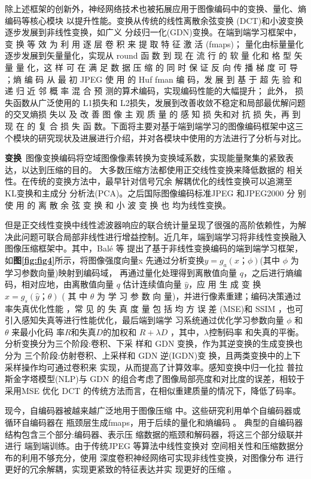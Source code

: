 除上述框架的创新外，神经网络技术也被拓展应用于图像编码中的变换、量化、熵编码等核心模块 以提升性能。变换从传统的线性离散余弦变换 (DCT)和小波变换逐步发展到非线性变换，如广义 分歧归一化(GDN)变换。在端到端学习框架中，变 换 等 效 为 利 用 逐 层 卷 积 来 提 取 特 征 激 活 (fmaps)； 量化由标量量化逐步发展到矢量量化，实现从 round 函 数 到 现 在 流 行 的 软 量 化和 格 型 矢 量 量 化，这 样 可 在 满 足 数 据 压 缩 的 同 时 保 证 反 向 传 播 梯 度 可 导 ；熵 编 码 从 最 初 JPEG 使 用 的 Huf fman 编 码，发 展 到 基 于 超 先 验 和 递 归 近 邻 概 率 混 合 预 测的算术编码，实现编码性能的大幅提升； 此外， 损失函数从广泛使用的 L1损失和 L2损失，发展到改善收敛不稳定和局部最优解问题的交叉熵损 失以 及 改 善 图 像 主 观 质 量 的 感 知 损 失和对 抗 损 失，再 到 现 在 的 复 合 损 失 函 数。下面将主要对基于端到端学习的图像编码框架中这三个模块的研究现状及进展进行介绍，并对各模块中使用的方法进行了分析与对比。

\noindent\textbf{变换}~图像变换编码将空域图像像素转换为变换域系数，实现能量聚集的紧致表达，以达到压缩的目的。 大多数压缩方法都使用正交线性变换来降低数据的 相关性。在传统的变换方法中，最早针对信号冗余 解耦优化的线性变换可以追溯至 KL变换和主成分 分析法(PCA)。之后国际图像编码标准JPEG 和JPEG2000 分 别 使 用 的 离 散 余 弦 变 换 和 小 波 变 换 也 均为线性变换。

但是正交线性变换中线性滤波器响应的联合统计量呈现了很强的高阶依赖性，为解决此问题可联合局部非线性进行增益控制。近几年，端到端学习将非线性变换融入图像压缩框架中。其中，Balé 等 \cite{balle2016end, DBLP:conf/pcs/BalleLS16}提出了基于非线性变换编码的端到端学习框架，如\textbf{图\ref{fig:fig4}}所示，将图像强度向量x 先通过分析变换$y= g_a(x；\phi)$(其中 $\phi$ 为学习参数向量)映射到编码域， 再通过量化处理得到离散值向量 $q$，之后进行熵编码，相对应地，由离散值向量 $q$ 估计连续值向量 $\hat{y}$，应 用 生 成 变 换 $\hat{x}=g_s(\hat{y}；\theta)$ ( 其 中 $\theta$ 为 学 习 参 数 向 量)，并进行像素重建；编码决策通过率失真优化性能 ，常 见 的 失 真 度 量 包 括 均 方 误 差 (MSE)和 SSIM ，也可引入感知失真等进行性能优化，最后端到端学 习系统通过优化学习参数向量 $\phi$ 和 $\theta$ 来最小化码 率$R$和失真$D$的加权和 $R+\lambda D$ ，其中，$\lambda$控制码率 和失真的平衡。分析变换分为三个阶段:卷积、下采 样和 GDN 变换，作为其逆变换的生成变换也分为 三个阶段:仿射卷积、上采样和 GDN 逆(IGDN)变 换，且两类变换中的上下采样操作均可通过卷积来 实现，从而提高了计算效率。感知变换中归一化拉 普拉斯金字塔模型(NLP)与 GDN 的组合考虑了图像局部亮度和对比度的误差，相较于采用MSE 优化 DCT 的传统方法而言，在相似重建质量的情况下，降低了码率。

现今，自编码器被越来越广泛地用于图像压缩 中。这些研究利用单个自编码器或循环自编码器在 瓶颈层生成fmaps，用于后续的量化和熵编码 \cite{liu2018deep}。 典型的自编码器结构包含三个部分:编码器、表示压 缩数据的瓶颈和解码器，将这三个部分级联并进行 端到端训练。由于传统JPEG 等算法中线性变换对 空间相关性和压缩数据分布的利用不够充分，使用 深度卷积神经网络可实现非线性变换，对图像分布 进行更好的冗余解耦，实现更紧致的特征表达并实 现更好的压缩 \cite{theis2017lossy, zhao2018multiple, zhao2019learning, li2018learning}。

